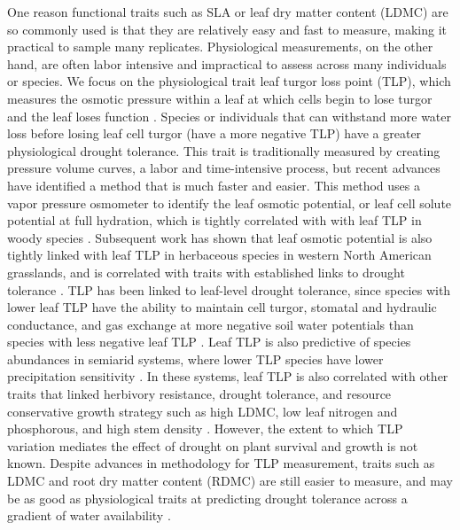 \documentclass[12pt, letterpaper]{article}
\begin{document}
One reason functional traits such as SLA or leaf dry matter content (LDMC) are so commonly used is that they are relatively easy and fast to measure, making it practical to sample many replicates. Physiological measurements, on the other hand, are often labor intensive and impractical to assess across many individuals or species. We focus on the physiological trait leaf turgor loss point (TLP), which measures the osmotic pressure within a leaf at which cells begin to lose turgor and the leaf loses function \citep{Bartlett2012a}. Species or individuals that can withstand more water loss  before losing leaf cell turgor (have a more negative TLP) have a greater physiological drought tolerance. This trait is traditionally measured by creating pressure volume curves, a labor and time-intensive process, but recent advances have identified a method that is much faster and easier. This method uses a vapor pressure osmometer to identify the leaf osmotic potential, or leaf cell solute potential at full hydration, which is tightly correlated with with leaf TLP in woody species \citep{Bartlett2012}. Subsequent work has shown that leaf osmotic potential is also tightly linked with leaf TLP in herbaceous species in western North American grasslands, and is correlated with traits with established links to drought tolerance \citep{Griffin-Nolan2019}. TLP has been linked to leaf-level drought tolerance, since species with lower leaf TLP have the ability to maintain cell turgor, stomatal and hydraulic conductance, and gas exchange at more negative soil water potentials than species with less negative leaf TLP \citep{Bartlett2012a}. Leaf TLP is also predictive of species abundances in semiarid systems, where lower TLP species have lower precipitation sensitivity \citep{Wilcox2020PlantPrairie}. In these systems, leaf TLP is also correlated with other traits that linked herbivory resistance, drought tolerance, and resource conservative growth strategy such as high LDMC, low leaf nitrogen and phosphorous, and high stem density \citep{Blumenthal2020}. However, the extent to which TLP variation mediates the effect of drought on plant survival and growth is not known. Despite advances in methodology for TLP measurement, traits such as LDMC and root dry matter content (RDMC) are still easier to measure, and may be as good as physiological traits at predicting drought tolerance across a gradient of water availability \citep{Bartlett2012,Griffin-Nolan2019,Blumenthal2020}.
\end{document}
